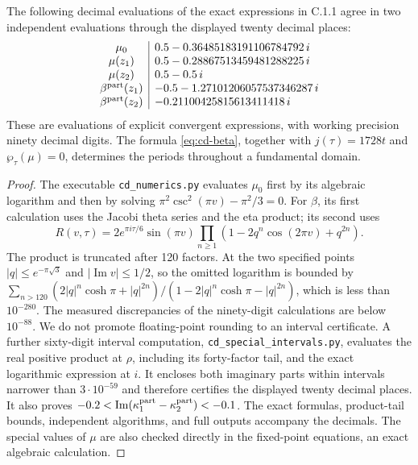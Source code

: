 \begin{proposition}[C.1.2; Proved]\label{st:C.1.2}
The following decimal evaluations of the exact expressions in C.1.1 agree
in two independent evaluations through the displayed twenty decimal places:
\[
\begin{array}{c|l}
\mu_0&0.5-0.36485183191106784792\,i\\
\mu(z_1)&0.5-0.28867513459481288225\,i\\
\mu(z_2)&0.5-0.5\,i\\
\beta^{\rm part}(z_1)&-0.5-1.27101206057537346287\,i\\
\beta^{\rm part}(z_2)&-0.21100425815613411418\,i
\end{array}
\]
These are evaluations of explicit convergent expressions, with working
precision ninety decimal digits. The formula \eqref{eq:cd-beta}, together
with \(j(\tau)=1728t\) and \(\wp_\tau(\mu)=0\), determines the periods
throughout a fundamental domain.
\end{proposition}
\begin{proof}
The executable \texttt{cd\_numerics.py} evaluates \(\mu_0\) first by its
algebraic logarithm and then by solving
\(\pi^2\csc^2(\pi v)-\pi^2/3=0\). For \(\beta\), its first calculation uses
the Jacobi theta series and the eta product; its second uses
\[
 R(v,\tau)=2e^{\pi i\tau/6}\sin(\pi v)
 \prod_{n\geq1}(1-2q^n\cos(2\pi v)+q^{2n}).
\]
The product is truncated after 120 factors. At the two specified points
\(|q|\leq e^{-\pi\sqrt3}\) and \(|\operatorname{Im}v|\leq1/2\), so the
omitted logarithm is bounded by
\(\sum_{n>120}(2|q|^n\cosh\pi+|q|^{2n})/(1-2|q|^n\cosh\pi-|q|^{2n})\),
which is less than \(10^{-280}\). The measured discrepancies of the
ninety-digit calculations are below \(10^{-88}\). We do not promote floating-point rounding to an interval certificate.
A further sixty-digit interval computation, \texttt{cd\_special\_intervals.py},
evaluates the real positive product at $\rho$, including its forty-factor
tail, and the exact logarithmic expression at $i$. It encloses both
imaginary parts within intervals narrower than $3\cdot10^{-59}$ and
therefore certifies the displayed twenty decimal places. It also proves
$-0.2<\operatorname{Im}(\kappa_1^{\rm part}-\kappa_2^{\rm part})<-0.1$.
The exact formulas, product-tail bounds, independent algorithms, and
full outputs accompany the decimals. The special values of \(\mu\) are also checked directly in
the fixed-point equations, an exact algebraic calculation.
\end{proof}

